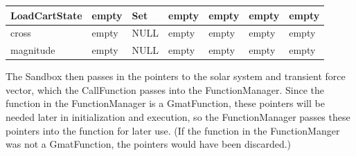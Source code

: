 \pagebreak 

\begin{center}
\tablelasttail{\hline}
\begin{supertabular}{|m{0.9in}|m{0.8in}|m{0.7in}|m{0.7in}|m{0.7in}|m{0.8in}|m{0.7in}|}
\hline
LoadCartState & empty & Set & empty & empty & empty & empty\\\hline
cross & empty & NULL & empty & empty & empty & empty\\\hline
magnitude & empty & NULL & empty & empty & empty & empty\\\hline
\end{supertabular}
\end{center}

The Sandbox then passes in the pointers to the solar system and transient force vector, which the
CallFunction passes into the FunctionManager.  Since the function in the FunctionManager is a
GmatFunction, these pointers will be needed later in initialization and execution, so the
FunctionManager passes these pointers into the function for later use.  (If the function in the
FunctionManger was not a GmatFunction, the pointers would have been discarded.)

